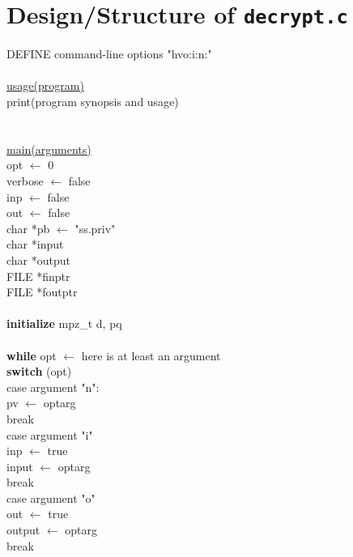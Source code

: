 \documentclass[12pt]{article}
\begin{document}
\section{Design/Structure of \texttt{decrypt.c}}

DEFINE command-line options "hvo:i:n:" \\
\\
\underline{usage(program)} \\
\indent print(program synopsis and usage) \\
\\
\\
\underline{main(arguments)} \\
\indent opt $\leftarrow$ 0 \\
\indent verbose $\leftarrow$ false \\
\indent inp $\leftarrow$ false \\
\indent out $\leftarrow$ false \\
\indent char *pb $\leftarrow$ "ss.priv" \\
\indent char *input \\
\indent char *output \\
\indent FILE *finptr \\
\indent FILE *foutptr \\
\\
\indent \textbf{initialize} mpz\_t d, pq \\
\\
\indent \textbf{while} opt $\leftarrow$ here is at least an argument \\
\indent \indent \textbf{switch} (opt) \\
\indent \indent \indent case argument "n": \\
\indent \indent \indent \indent pv $\leftarrow$ optarg \\
\indent \indent \indent \indent break \\
\indent \indent \indent case argument "i" \\
\indent \indent \indent \indent inp $\leftarrow$ true \\
\indent \indent \indent \indent input $\leftarrow$ optarg \\
\indent \indent \indent \indent break \\
\indent \indent \indent case argument "o" \\
\indent \indent \indent \indent out $\leftarrow$ true \\
\indent \indent \indent \indent output $\leftarrow$ optarg \\
\indent \indent \indent \indent break \\
\end{document}
